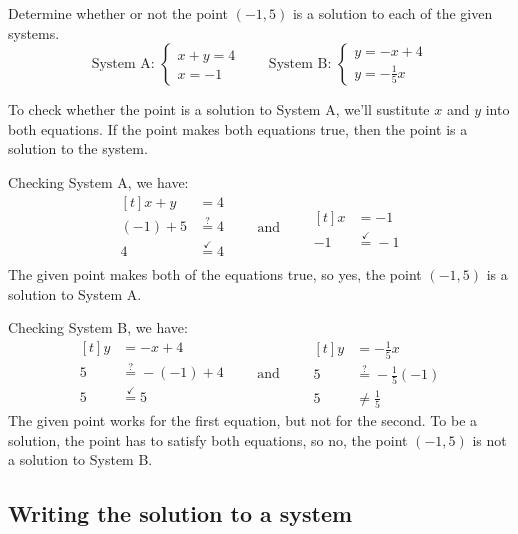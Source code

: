 \begin{boxedex}
Determine whether or not the point $(-1,5)$ is a solution to each of the given systems.
\[
\text{System A: }\left\{%
\begin{array}{l}
x+y=4\\
x=-1
\end{array}
\right.
\qquad
\text{System B: }\left\{%
\begin{array}{l}
y=-x+4\\
y=-\tfrac{1}{5}x
\end{array}
\right.
\] 

To check whether the point is a solution to System A, we'll sustitute $x$ and $y$ into both equations. If the point makes both equations true, then the point is a solution to the system.

Checking System A, we have:
\[
\begin{aligned}[t]
x+y		&=4\\
(-1)+5	&\overset{?}{=}4\\
4 		&\overset{\checkmark}{=} 4\\
\end{aligned}
\qquad\text{and}\qquad
\begin{aligned}[t]
x 	&= -1\\
-1	&\overset{\checkmark}{=}  -1
\end{aligned}
\]
The given point makes both of the equations true, so yes, the point $(-1,5)$ is a solution to System A.

Checking System B, we have:
\[
\begin{aligned}[t]
y		&=-x+4\\
5		&\overset{?}{=}-(-1)+4\\
5 		&\overset{\checkmark}{=} 5\\
\end{aligned}
\qquad\text{and}\qquad
\begin{aligned}[t]
y 	&= -\tfrac{1}{5}x\\
5	&\overset{?}{=} -\tfrac{1}{5}(-1)\\
5	&\neq \tfrac{1}{5}
\end{aligned}
\] 
The given point works for the first equation, but not for the second. To be a solution, the point has to satisfy both equations, so no, the point $(-1,5)$ is not a solution to System B.
\end{boxedex}

\subsection{Writing the solution to a system}

